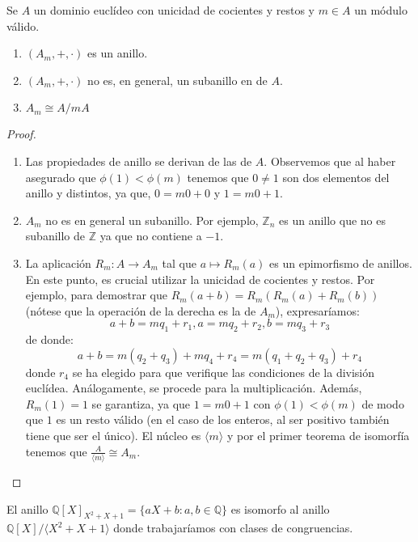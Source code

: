 \begin{proposition}
Se $A$ un dominio euclídeo con unicidad de cocientes y restos y $m \in A$ un módulo válido. 

\begin{enumerate}
\item $(A_m,+,\cdot)$ es un anillo.
\item $(A_m,+,\cdot)$ no es, en general, un subanillo en de $A$.
\item $A_m \cong A/mA$
\end{enumerate}
\end{proposition}
\begin{proof}
\begin{enumerate}
\item Las propiedades de anillo se derivan de las de $A$. Observemos que al haber asegurado que $\phi(1) < \phi(m)$ tenemos que $0 \neq 1$ son dos elementos del anillo y distintos, ya que, $0 = m0+0$ y $1 = m0 + 1$. 

\item $A_m$ no es en general un subanillo. Por ejemplo, $\mathbb{Z}_n$ es un anillo que no es subanillo de $\mathbb{Z}$ ya que no contiene a $-1$. 

\item La aplicación $R_m:A \to A_m$ tal que $a \mapsto R_m(a)$ es un epimorfismo de anillos. En este punto, es crucial utilizar la unicidad de cocientes y restos. Por ejemplo, para demostrar que $R_m(a+b) = R_m(R_m(a)+R_m(b))$ (nótese que la operación de la derecha es la de $A_m$), expresaríamos: $$a+b = mq_1 + r_1, a = mq_2+r_2, b = mq_3 +r_3$$ de donde: $$a+b = m(q_2+q_3) + mq_4 + r_4 = m(q_1+q_2+q_3)+r_4$$ donde $r_4$ se ha elegido para que verifique las condiciones de la división euclídea. Análogamente, se procede para la multiplicación. Además, $R_m(1) = 1$ se garantiza, ya que $1 = m0+1$ con $\phi(1) < \phi(m)$ de modo que $1$ es un resto válido (en el caso de los enteros, al ser positivo también tiene que ser el único). El núcleo es $\langle m \rangle$ y por el primer teorema de isomorfía tenemos que $\frac{A}{\langle m \rangle} \cong A_m$. 
\end{enumerate}
\end{proof}

\begin{example}
El anillo $\mathbb{Q}[X]_{X^2+X+1} = \{aX+b:a,b \in \mathbb{Q}\}$ es isomorfo al anillo $\mathbb{Q}[X]/\langle X^2+X+1 \rangle$ donde trabajaríamos con clases de congruencias. 
\end{example}

